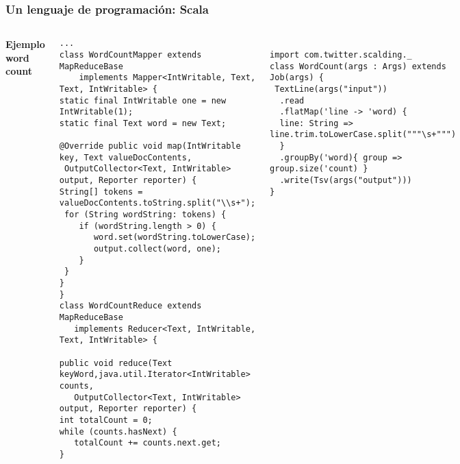 \documentclass{beamer}
\begin{document}
\begin{frame}[fragile]
\frametitle{Un lenguaje de programación: Scala}
\begin{columns}[c] %

\textbf{Ejemplo word count}
\begin{example}
\begin{tiny}\fontsize{1}{1}\selectfont
\begin{verbatim}
...
class WordCountMapper extends MapReduceBase
    implements Mapper<IntWritable, Text, Text, IntWritable> {
static final IntWritable one = new IntWritable(1);
static final Text word = new Text;

@Override public void map(IntWritable key, Text valueDocContents,
 OutputCollector<Text, IntWritable> output, Reporter reporter) {
String[] tokens = valueDocContents.toString.split("\\s+");
 for (String wordString: tokens) {
    if (wordString.length > 0) {
       word.set(wordString.toLowerCase);
       output.collect(word, one);
    }
 }
}
}
class WordCountReduce extends MapReduceBase
   implements Reducer<Text, IntWritable, Text, IntWritable> {
	
public void reduce(Text keyWord,java.util.Iterator<IntWritable> counts,
   OutputCollector<Text, IntWritable> output, Reporter reporter) {
int totalCount = 0;
while (counts.hasNext) {
   totalCount += counts.next.get;
}
\end{verbatim}\end{tiny}
\end{example}
\begin{example}
\begin{tiny}\fontsize{1}{1}\selectfont
\begin{verbatim}

import com.twitter.scalding._
class WordCount(args : Args) extends Job(args) {
 TextLine(args("input"))
  .read
  .flatMap('line -> 'word) {
  line: String => line.trim.toLowerCase.split("""\s+""")
  }
  .groupBy('word){ group => group.size('count) }
  .write(Tsv(args("output")))
}

\end{verbatim}\end{tiny}
\end{example}
\end{columns}
\end{frame}
\end{document}
